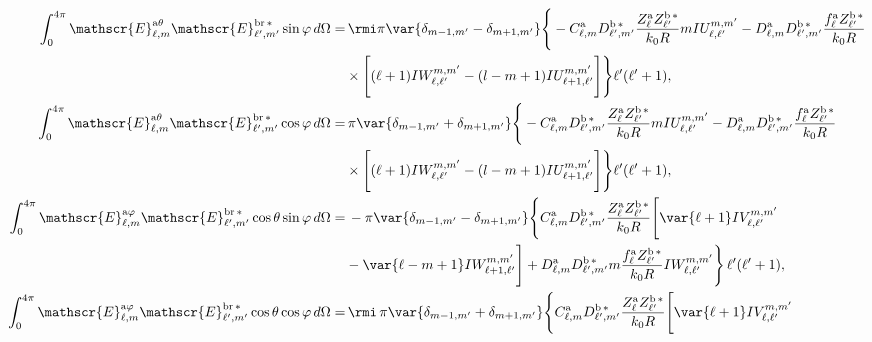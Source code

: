 \begin{align}
\int_{0}^{4\pi} \mathscr{E}_{\ell, m}^{\text{a}\theta}\mathscr{E}_{\ell^{\prime}, m^{\prime}}^{\text{br}\,*} \sin\varphi \, d\Omega =& 
%
\, \rmi \pi \var{ \delta_{m-1, m^{\prime}} - \delta_{m+1, m^{\prime}} } \Bigg\{-C_{\ell,m}^{\rm a}D_{\ell^{\prime}, m^{\prime}}^{\rm b \, *}\frac{Z_{\ell}^{\rm a}Z_{\ell^{\prime}}^{\rm b\, *}}{k_0 R} m IU_{\ell, \ell^{\prime}}^{m, m^{\prime}} 
%
-D_{\ell, m}^{\rm a}D_{\ell^{\prime}, m^{\prime}}^{\rm b \, *} \frac{f_{\ell}^{\rm a}Z_{\ell^{\prime}}^{\rm b \, *}}{k_0 R} \nonumber \\
%
& \times \Bigg[ (\ell+1) IW_{\ell, \ell^{\prime}}^{m, m^{\prime}} 
%
-(l-m+1) IU_{\ell + 1, \ell^{\prime}}^{m, m^{\prime}} \Bigg] \Bigg\}\ell^{\prime}(\ell^{\prime}+1),\\
%
%
%
\int_{0}^{4\pi} \mathscr{E}_{\ell, m}^{\text{a}\theta}\mathscr{E}_{\ell^{\prime}, m^{\prime}}^{\text{br}\,*} \cos\varphi \, d\Omega =& 
%
\, \pi \var{ \delta_{m-1, m^{\prime}} + \delta_{m+1, m^{\prime}} } \Bigg\{-C_{\ell,m}^{\rm a}D_{\ell^{\prime}, m^{\prime}}^{\rm b \, *}\frac{Z_{\ell}^{\rm a}Z_{\ell^{\prime}}^{\rm b\, *}}{k_0 R} m IU_{\ell, \ell^{\prime}}^{m, m^{\prime}} 
%
-D_{\ell, m}^{\rm a}D_{\ell^{\prime}, m^{\prime}}^{\rm b \, *} \frac{f_{\ell}^{\rm a}Z_{\ell^{\prime}}^{\rm b \, *}}{k_0 R} \nonumber \\
%
& \times \Bigg[ (\ell+1) IW_{\ell, \ell^{\prime}}^{m, m^{\prime}} 
%
-(l-m+1) IU_{\ell + 1, \ell^{\prime}}^{m, m^{\prime}} \Bigg] \Bigg\}\ell^{\prime}(\ell^{\prime}+1),\\
%
%
%
\int_0^{4\pi}\mathscr{E}_{\ell, m}^{\text{a}\varphi}\mathscr{E}_{\ell^{\prime}, m^{\prime}}^{\text{br}\,*}\cos\theta\sin\varphi \, d\Omega
%
 =& \, - \pi \var{ \delta_{m-1, m^{\prime}} - \delta_{m+1, m^{\prime}} } \Bigg\{ C_{\ell, m}^{\rm a} D_{\ell^{\prime}, m^{\prime}}^{\rm b \, *} \frac{Z_{\ell}^{\rm a} Z_{\ell^{\prime}}^{\rm b \, *}}{k_0 R} \Bigg[\var{\ell +1} IV_{\ell, \ell^{\prime}}^{m, m^{\prime}} \nonumber \\ 
% 
&-\var{\ell - m +1} IW_{\ell + 1, \ell^{\prime}}^{m, m^{\prime}} \Bigg]
%
 + D_{\ell, m}^{\rm a} D_{\ell^{\prime}, m^{\prime}}^{\rm b \, *} m \frac{f_{\ell}^{\rm a} Z_{\ell^{\prime}}^{\rm b\, *}}{k_0 R} IW_{\ell, \ell^{\prime}}^{m, m^{\prime}} \Bigg\} \, \ell^{\prime}(\ell^{\prime}+1),  \\
%
%
%
\int_0^{4\pi}\mathscr{E}_{\ell, m}^{\text{a}\varphi}\mathscr{E}_{\ell^{\prime}, m^{\prime}}^{\text{br}\,*}\cos\theta\cos\varphi \, d\Omega
%
 =& \, \rmi \, \pi \var{ \delta_{m-1, m^{\prime}} + \delta_{m+1, m^{\prime}} } \Bigg\{ C_{\ell, m}^{\rm a} D_{\ell^{\prime}, m^{\prime}}^{\rm b \, *} \frac{Z_{\ell}^{\rm a} Z_{\ell^{\prime}}^{\rm b \, *}}{k_0 R} \Bigg[\var{\ell +1} IV_{\ell, \ell^{\prime}}^{m, m^{\prime}} \nonumber \\ 

\end{align}

